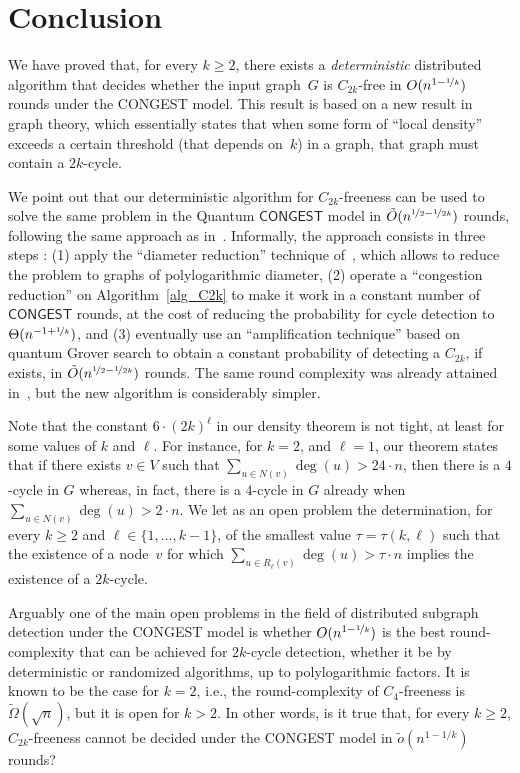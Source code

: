 \documentclass{article}
\newcommand{\lebontau}{6\cdot (2k)^\ell}
\newcommand{\CONGEST}{\textsf{CONGEST}}
\begin{document}
\section{Conclusion}\label{sec:conclu}


We have proved that, for every $k\geq 2$, there exists a \emph{deterministic} distributed algorithm that decides whether the input graph~$G$ is $C_{2k}$-free in $O(n^{1-\nicefrac{1}{k}})$ rounds under the \CONGEST\/ model. This result is based on a new result in graph theory, which essentially states that when some form of  ``local density'' exceeds a certain threshold (that depends on~$k$) in a graph, that graph must contain a $2k$-cycle. 

We point out that our deterministic algorithm for $C_{2k}$-freeness can be used to solve the same problem in the Quantum $\CONGEST$ model in $\tilde{O}(n^{\nicefrac{1}{2}-\nicefrac{1}{2k}})$ rounds, following the same approach as in~\cite{FraigniaudLMT24}. Informally, the approach consists in three steps : (1) apply the “diameter reduction” technique of~\cite{eden2022sublinear}, which allows to reduce the problem to graphs of polylogarithmic diameter, (2) operate a “congestion reduction” on Algorithm~\ref{alg_C2k} to make it work in a constant number of $\CONGEST$ rounds, at the cost of reducing the probability for cycle detection to $\Theta(n^{-1+\nicefrac{1}{k}})$, and (3) eventually use an “amplification technique” based on quantum Grover search to obtain a constant probability of detecting a $C_{2k}$, if exists, in $\tilde{O}(n^{\nicefrac{1}{2}-\nicefrac{1}{2k}})$ rounds. The same round complexity was already attained in~\cite{FraigniaudLMT24}, but the new algorithm is considerably simpler.

Note that the constant $\lebontau$ in our density theorem is not tight, at least for some values of $k$ and $\ell$. For instance, for $k=2$, and $\ell=1$, our theorem states that if there exists $v\in V$ such that $\sum_{u\in N(v)}\deg(u) > 24\cdot n$, then there is a $4$-cycle in $G$ whereas, in fact, there is a $4$-cycle in $G$ already when $\sum_{u\in N(v)}\deg(u) > 2\cdot n$. We let as an open problem the determination, for every $k\geq 2$ and $\ell\in\{1,\dots,k-1\}$, of the smallest value $\tau=\tau(k,\ell)$ such that the existence of a node~$v$ for which $\sum_{u\in R_\ell(v)}\deg(u) > \tau \cdot n$ implies the existence of a $2k$-cycle. 

Arguably one of the main open problems in the field of distributed subgraph detection under the \CONGEST\/ model is whether $O(n^{1-\nicefrac{1}{k}})$ is the best round-complexity that can be achieved for $2k$-cycle detection, whether it be by deterministic or randomized algorithms, up to polylogarithmic factors. It is known to be the case for $k=2$, i.e., the round-complexity of $C_4$-freeness is $\tilde\Omega(\sqrt{n})$, but it is open for $k>2$. In other words, is it true that, for every $k\geq 2$, $C_{2k}$-freeness cannot be decided under the \CONGEST\/ model in $\tilde o(n^{1-1/k})$ rounds? 




\end{document}
